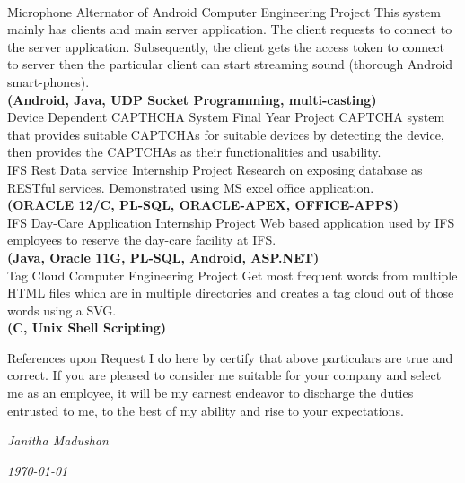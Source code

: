 \documentclass[]{cv-class}
\begin{document}
\newpage
\begin{aside}
\end{aside}

\begin{entrylist}
	\\
	\entry
    {}
    {Microphone Alternator of Android}
    {Computer Engineering Project}
    {This system mainly has clients and main server application. The client requests to connect to the server application. Subsequently, the client gets the access token to connect to server then the particular client can start streaming sound (thorough Android smart-phones). \\\textbf{(Android, Java, UDP Socket Programming, multi-casting)}}
    \\
	\entry
    {}
    {Device Dependent CAPTHCHA System}
    {Final Year Project}
    {CAPTCHA system that provides suitable CAPTCHAs for suitable devices by  detecting  the  device, then provides the CAPTCHAs as their functionalities and usability.}
	\\
  \entry
    {}
    {IFS Rest Data service}
    {Internship Project}
    {Research on exposing database as  RESTful  services. Demonstrated  using  MS  excel  office  application.\\\textbf{(ORACLE 12/C, PL-SQL, ORACLE-APEX, OFFICE-APPS)}}
	\\
  \entry
    {}
    {IFS Day-Care Application}
    {Internship Project}
    {Web  based  application  used  by  IFS  employees  to  reserve  the  day-care facility at IFS. \\\textbf{(Java, Oracle 11G, PL-SQL, Android, ASP.NET)}}
	\\  
  \entry
    {}
    {Tag Cloud}
    {Computer Engineering Project}
    {Get most frequent words from multiple HTML files which are in multiple directories and creates a tag cloud out of those words using a SVG. \\\textbf{(C, Unix Shell Scripting)}}
\end{entrylist}

\begin{entrylist}
  \entry
    {}
    {}
    {}
    {References upon Request}
  \entry
    {}
    {}
    {}
    {I do here by certify that above particulars are true and correct. If you are pleased to consider me suitable for your company and select me as an employee, it will be my earnest endeavor to discharge the duties entrusted to me, to the best of my ability and rise to your expectations.}
\end{entrylist}

\begin{flushright}
\emph{Janitha Madushan}
\end{flushright}
\begin{flushright}
\emph{\today}
\end{flushright}
\end{document}
